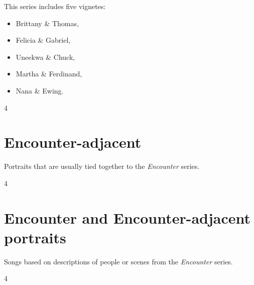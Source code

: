 \documentclass[a4paper,landscape]{memoir}
\begin{document}
This series includes five vignetes:
\begin{itemize}
\item Brittany \& Thomas,
\item Felicia \& Gabriel,
\item Uneekwa \& Chuck,
\item Martha \& Ferdinand,
\item Nana \& Ewing.
\end{itemize}
\clearpage\begin{multicols*}{4}



















\end{multicols*}

\chapter{Encounter-adjacent}
Portraits that are usually tied together to the \emph{Encounter} series.
\clearpage\begin{multicols*}{4}




\end{multicols*}

\chapter{Encounter and Encounter-adjacent portraits}
Songs based on descriptions of people or scenes from the \emph{Encounter} series.
\clearpage\begin{multicols*}{4}







\end{multicols*}
\end{document}
